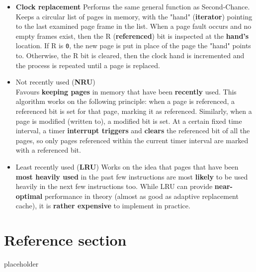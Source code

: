 \documentclass{article}
\begin{document}
\begin{flushleft}
\begin{itemize}
	\item \textbf{Clock replacement}
	Performs the same general function as Second-Chance. Keeps a circular list of pages in memory, with the "hand" (\textbf{iterator}) pointing to the last examined page frame in the list. When a page fault occurs and no empty frames exist, then the R (\textbf{referenced}) bit is inspected at the \textbf{hand's} location. If R is \texttt{0}, the new page is put in place of the page the "hand" points to. Otherwise, the R bit is cleared, then the clock hand is incremented and the process is repeated until a page is replaced.
	
	
	\item Not recently used (\textbf{NRU}) \\
	Favours \textbf{keeping pages} in memory that have been \textbf{recently} used. This algorithm works on the following principle: when a page is referenced, a referenced bit is set for that page, marking it as referenced. Similarly, when a page is modified (written to), a modified bit is set. At a certain fixed time interval, a timer \textbf{interrupt triggers} and \textbf{clears} the referenced bit of all the pages, so only pages referenced within the current timer interval are marked with a referenced bit. 

	\item Least recently used (\textbf{LRU})
	Works on the idea that pages that have been \textbf{most heavily used} in the past few instructions are most \textbf{likely} to be used heavily in the next few instructions too. While LRU can provide \textbf{near-optimal} performance in theory (almost as good as adaptive replacement cache), it is \textbf{rather expensive} to implement in practice. 
\end{itemize}
\end{flushleft}

\pagebreak
\section*{Reference section} \label{sec:reference}
\begin{description}
	\item[placeholder] \hfill \\
\end{description}
\end{document}
